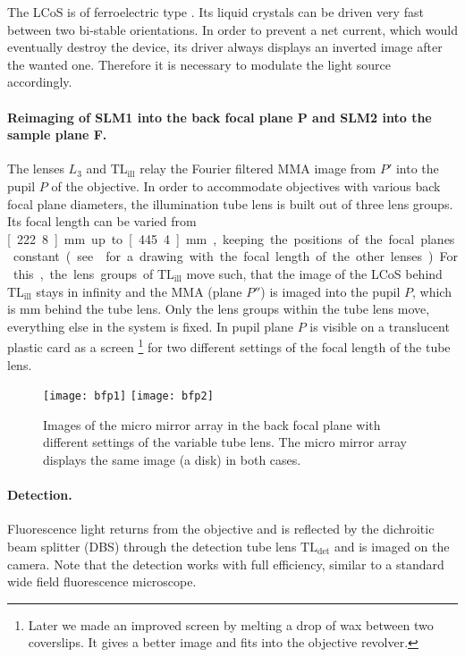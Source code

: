 
The LCoS is of ferroelectric type \citetext{\citealp[see][]{1991Saleh}
  and \citealp[p.~192]{Goodman1996}}.  Its liquid crystals can be
driven very fast between two bi-stable orientations. In order to
prevent a net current, which would eventually destroy the device, its
driver always displays an inverted image after the wanted
one. Therefore it is necessary to modulate the light source
accordingly.


\paragraph{Reimaging of SLM1 into the back focal plane P and SLM2 into
  the sample plane F.}
The lenses $L_3$ and $\textrm{TL}_\textrm{ill}$ relay the Fourier
filtered MMA image from $P'$ into the pupil $P$ of the objective. In
order to accommodate objectives with various back focal plane
diameters, the illumination tube lens is built out of three lens
groups. Its focal length can be varied from \unit[222.8]{mm} up to
\unit[445.4]{mm}, keeping the positions of the focal planes
constant(see  for a drawing with the focal
length of the other lenses). For this, the lens groups of
$\textrm{TL}_\textrm{ill}$ move such, that the image of the LCoS
behind $\textrm{TL}_\textrm{ill}$ stays in infinity and the MMA (plane
$P''$) is imaged into the pupil $P$, which is \unit[250]{mm} behind
the tube lens. Only the lens groups within the tube lens move,
everything else in the system is fixed. In 
pupil plane $P$ is visible on a translucent plastic card as a screen
\footnote{Later we made an improved screen by melting a drop of wax
  between two coverslips. It gives a better image and fits into the
  objective revolver.} for two different settings of the focal length
of the tube lens.

\begin{figure}[!htbp]
  \centering
  \texttt{[image: bfp1]}
  \texttt{[image: bfp2]}
  \caption{Images of the micro mirror array in the back focal plane
    with different settings of the variable tube lens. The micro mirror
    array displays the same image (a disk) in both cases.}
  \label{fig:tubelens-bfp}
\end{figure}


\paragraph{Detection.}
Fluorescence light returns from the objective and is reflected by the
dichroitic beam splitter (DBS) through the detection tube lens
$\textrm{TL}_\textrm{det}$ and is imaged on the camera. Note that the
detection works with full efficiency, similar to a standard wide field
fluorescence microscope.


